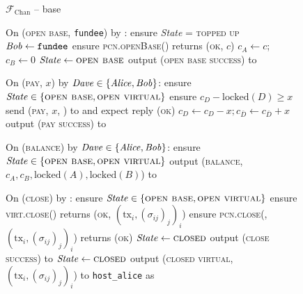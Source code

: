 \begin{figure}[H]
  \begin{systembox}{$\mathcal{F}_{\mathrm{Chan}}$ -- base}
    \begin{algorithmic}[1]
      \State On (\textsc{open base}, \texttt{fundee}) by \alice:
      \Indent
        \State ensure \textit{State} = \textsc{topped up}
        \State $\mathit{Bob} \gets \texttt{fundee}$
        \State ensure \textsc{pcn.openBase}(\bob) returns (\textsc{ok}, $c$)
        \State $c_A \gets c$; $c_B \gets 0$
        \State $\mathit{State} \gets \textsc{open base}$
        \State output (\textsc{open base success}) to \alice
      \EndIndent
      \Statex

      \State On (\textsc{pay}, $x$) by $\mathit{Dave} \in \{\mathit{Alice}, \mathit{Bob}\}$:
      \Indent
        \State ensure $\mathit{State} \in \{\textsc{open base}, \textsc{open
        virtual}\}$
        \State ensure $c_D - \mathrm{locked}(D) \geq x$
        \State send (\textsc{pay}, $x$, \dave) to \adversary and expect reply
        (\textsc{ok}) 
        \State $c_D \gets c_D - x; c_{\bar{D}} \gets c_{\bar{D}} + x$
        \State output (\textsc{pay success}) to \dave
      \EndIndent
      \Statex

      \State On (\textsc{balance}) by $\mathit{Dave} \in \{\mathit{Alice}, \mathit{Bob}\}$:
      \Indent
        \State ensure $\mathit{State} \in \{\textsc{open base}, \textsc{open
        virtual}\}$
        \label{code:functionality:chan:skeleton:base:balance:start}
        \State output (\textsc{balance}, $c_A, c_B, \mathrm{locked}(A),
        \mathrm{locked}(B)$) to \dave
        \label{code:functionality:chan:skeleton:base:balance:end}
      \EndIndent
      \Statex

      \State On (\textsc{close}) by \alice:
      \Indent
        \State ensure $\mathit{State} \in \{\textsc{open base}, \textsc{open
        virtual}\}$
        \label{code:functionality:chan:skeleton:close:start}
        \State ensure \textsc{virt.close}(\alice) returns (\textsc{ok},
        $(\mathrm{tx}_i, (\sigma_{ij})_j)_i$) 
          \State ensure \textsc{pcn.close}(\alice, $(\mathrm{tx}_i,
          (\sigma_{ij})_j)_i$) returns (\textsc{ok})
          \State $\mathit{State} \gets \textsc{closed}$
          \State output (\textsc{close success}) to \alice
        \Else \: 
          \State $\mathit{State} \gets \textsc{closed}$
          \State output (\textsc{closed virtual}, $(\mathrm{tx}_i,
          (\sigma_{ij})_j)_i$) to \texttt{host\_alice} as \alice
        \EndIf
        \label{code:functionality:chan:skeleton:close:end}
      \EndIndent
      \Statex


\end{algorithmic}
\end{systembox}
\end{figure}
